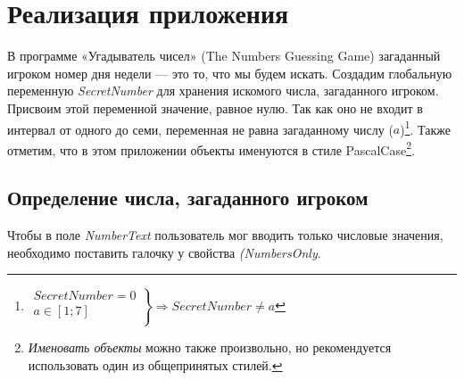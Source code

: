 \section{Реализация приложения}
\label{styles}
В программе «Угадыватель чисел» (The Numbers Guessing Game)\cite{PanfilovaApp} загаданный игроком номер дня недели — это то, что мы будем искать.
Создадим глобальную переменную  \textit{SecretNumber} для хранения искомого числа, загаданного игроком. Присвоим этой переменной значение, равное нулю. 
Так как оно не входит в интервал от одного до семи, переменная не равна загаданному числу ($ a $)\footnote[][-0cm]{$ \left.\begin{array}{ccc}
  SecretNumber = 0 \\
  a \in [1;7] \\
\end{array}
\right\}\Rightarrow SecretNumber \neq a $}. Также
отметим, что в этом приложении объекты именуются в стиле PascalCase\footnote[][-0cm]{ \emph{Именовать объекты} 
можно также произвольно, но рекомендуется использовать один из общепринятых стилей.
}. 
\subsection{Определение числа, загаданного игроком}
Чтобы в поле \textit{NumberText} пользователь мог вводить только числовые значения, необходимо поставить галочку у свойства \textit{(NumbersOnly}.

